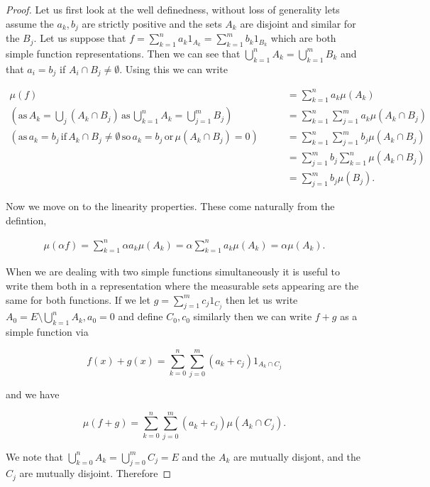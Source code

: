 \documentclass[
]{book}
\theoremstyle{definition}
\theoremstyle{definition}
\theoremstyle{definition}
\theoremstyle{definition}
\theoremstyle{remark}
\begin{document}
\begin{proof}
Let us first look at the well definedness, without loss of generality lets assume the \(a_k, b_j\) are strictly positive and the sets \(A_k\) are disjoint and similar for the \(B_j\). Let us suppose that \(f = \sum_{k=1}^n a_k 1_{A_k} = \sum_{k=1}^m b_k 1_{B_k}\) which are both simple function representations. Then we can see that \(\bigcup_{k=1}^nA_k = \bigcup_{k=1}^m B_k\) and that \(a_i =b_j\) if \(A_i \cap B_j \neq \emptyset\). Using this we can write

\begin{align*} 
\mu(f) &= \sum_{k=1}^n a_k \mu(A_k)\\
\left(\mbox{as}\, A_k = \bigcup_j (A_k \cap B_j)\, \mbox{as}\, \bigcup_{k=1}^nA_k = \bigcup_{j=1}^m B_j\right) \quad \quad &= \sum_{k=1}^n \sum_{j=1}^m a_k \mu(A_k \cap B_j) \\
\left(\mbox{as}\, a_k = b_j\, \mbox{if}\, A_k \cap B_j \neq \emptyset\, \mbox{so}\, a_k=b_j\, \mbox{or}\, \mu(A_k\cap B_j) = 0\right) \quad \quad & = \sum_{k=1}^n \sum_{j=1}^m b_j \mu(A_k \cap B_j) \\
&= \sum_{j=1}^m b_j \sum_{k=1}^n \mu(A_k \cap B_j) \\
&= \sum_{j=1}^m b_j \mu(B_j).
\end{align*}

Now we move on to the linearity properties. These come naturally from the defintion,

\begin{align*}
\mu(\alpha f) = \sum_{k=1}^n \alpha a_k \mu(A_k) = \alpha \sum_{k=1}^n a_k \mu(A_k) = \alpha \mu(A_k).
\end{align*}

When we are dealing with two simple functions simultaneously it is useful to write them both in a representation where the measurable sets appearing are the same for both functions. If we let \(g = \sum_{j=1}^m c_j 1_{C_j}\) then let us write \(A_0 = E \setminus \bigcup_{k=1}^n A_k, a_0 =0\) and define \(C_0, c_0\) similarly then we can write \(f+g\) as a simple function via

\[f(x) + g(x) = \sum_{k=0}^n \sum_{j=0}^m (a_k + c_j) 1_{A_k \cap C_j}\]

and we have

\[ \mu(f+g) = \sum_{k=0}^n \sum_{j=0}^m (a_k +c_j) \mu(A_k \cap C_j). \]

We note that \(\bigcup_{k=0}^n A_k = \bigcup_{j=0}^m C_j = E\) and the \(A_k\) are mutually disjont, and the \(C_j\) are mutually disjoint. Therefore


\end{proof}
\end{document}
